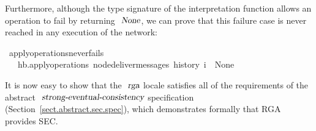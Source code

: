 Furthermore, although the type signature of the interpretation function allows an operation to fail by returning $\isa{None}$, we can prove that this failure case is never reached in any execution of the network:
\begin{isabelle}
\ apply{\isacharunderscore}operations{\isacharunderscore}never{\isacharunderscore}fails{\isacharcolon}\isanewline
\ \ \ {\isachardoublequoteopen}hb.apply{\isacharunderscore}operations\ {\isacharparenleft}node{\isacharunderscore}deliver{\isacharunderscore}messages\ {\isacharparenleft}history\ i{\isacharparenright}{\isacharparenright}\ {\isasymnoteq}\ None{\isachardoublequoteclose}
\end{isabelle}
It is now easy to show that the $\isa{rga}$ locale satisfies all of the requirements of the abstract $\isa{strong-eventual-consistency}$ specification (Section~\ref{sect.abstract.sec.spec}), which demonstrates formally that RGA provides SEC.
